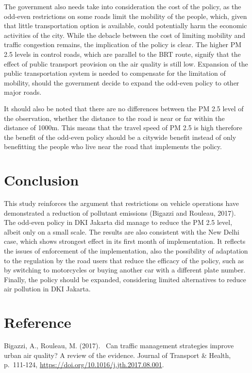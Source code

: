 \documentclass[AEJ]{AEA}
\begin{document}
The government also needs take into consideration the cost of the policy,
as the odd-even restrictions on some roads limit the mobility of the
people, which, given that little transportation option is available,
could potentially harm the economic activities of the city. While the
debacle between the cost of limiting mobility and traffic congestion
remains, the implication of the policy is clear. The higher PM 2.5
levels in control roads, which are parallel to the BRT route, signify
that the effect of public transport provision on the air quality is
still low. Expansion of the public transportation system is needed to
compensate for the limitation of mobility, should the government decide
to expand the odd-even policy to other major roads.~

It should also be noted that there are no differences between the PM 2.5
level of the observation, whether the distance to the road is near or far
within the distance of 1000m. This means that the travel speed of PM 2.5
is high therefore the benefit of the odd-even policy should be a
citywide benefit instead of only benefitting the people who live near
the road that implements the policy.


\section{Conclusion}

This study reinforces the argument that restrictions on vehicle
operations have demonstrated a reduction of pollutant emissions (Bigazzi
and Rouleau, 2017). The odd-even policy in DKI Jakarta did manage to
reduce the PM 2.5 level, albeit only on a small scale. The results are also
consistent with the New Delhi case, which shows strongest effect in its
first month of implementation. It reflects the issues of enforcement of
the implementation, also the possibility of adaptation to the regulation
by the road users that reduce the efficacy of the policy, such as by
switching to motorcycles or buying another car with a different plate
number. Finally, the policy should be expanded, considering
limited alternatives to reduce air pollution in DKI Jakarta.


\newpage
\appendix

\section{Reference}

Bigazzi, A., Rouleau, M. (2017).~ Can traffic management strategies
improve urban air quality? A review of the evidence. Journal of
Transport \& Health, p.~111-124,
\url{https://doi.org/10.1016/j.jth.2017.08.001}.
\end{document}
